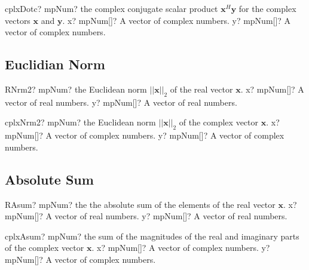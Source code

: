 \vspace{0.6cm}
\begin{mpFunctionsExtract}
	\mpFunctionTwo
	{cplxDotc? mpNum? the complex conjugate scalar product $\boldsymbol{x}^H \boldsymbol{y}$ for the complex  vectors $\boldsymbol{x}$ and $\boldsymbol{y}$.}
	{x? mpNum[]? A vector of complex numbers.}
	{y? mpNum[]? A vector of complex numbers.}
\end{mpFunctionsExtract}




\subsection{Euclidian Norm}

\begin{mpFunctionsExtract}
	\mpFunctionTwo
	{RNrm2? mpNum? the Euclidean norm $||\boldsymbol{x}||_2$ of the real vector $\boldsymbol{x}$.}
	{x? mpNum[]? A vector of real numbers.}
	{y? mpNum[]? A vector of real numbers.}
\end{mpFunctionsExtract}

\vspace{0.6cm}
\begin{mpFunctionsExtract}
	\mpFunctionTwo
	{cplxNrm2? mpNum? the Euclidean norm $||\boldsymbol{x}||_2$ of the complex vector $\boldsymbol{x}$.}
	{x? mpNum[]? A vector of complex numbers.}
	{y? mpNum[]? A vector of complex numbers.}
\end{mpFunctionsExtract}




\subsection{Absolute Sum}

\begin{mpFunctionsExtract}
	\mpFunctionTwo
	{RAsum? mpNum? the the absolute sum of the elements of the real vector $\boldsymbol{x}$.}
	{x? mpNum[]? A vector of real numbers.}
	{y? mpNum[]? A vector of real numbers.}
\end{mpFunctionsExtract}

\vspace{0.6cm}
\begin{mpFunctionsExtract}
	\mpFunctionTwo
	{cplxAsum? mpNum? the  sum of the magnitudes of the real and imaginary parts of the complex vector $\boldsymbol{x}$.}
	{x? mpNum[]? A vector of complex numbers.}
	{y? mpNum[]? A vector of complex numbers.}
\end{mpFunctionsExtract}




